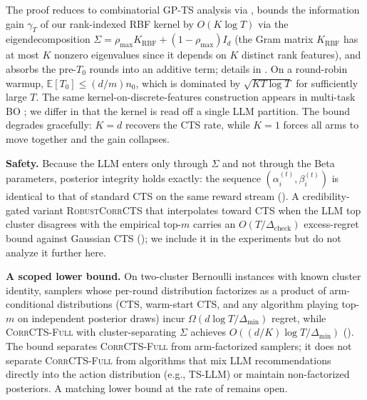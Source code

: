 \documentclass{article}
\theoremstyle{plain}
\theoremstyle{definition}
\theoremstyle{remark}
\newcommand{\E}{\mathbb{E}}
\newcommand{\gap}{\Delta_{\min}}
\newcommand{\CorrFull}{\textsc{CorrCTS-Full}}
\newcommand{\RobustCorr}{\textsc{RobustCorrCTS}}
\begin{document}
The proof reduces to combinatorial GP-TS analysis \citep{sandberg2025bayesian} via , bounds the information gain $\gamma_T$ of our rank-indexed RBF kernel by $O(K \log T)$ via the eigendecomposition $\Sigma = \rho_{\max} K_{\mathrm{RBF}} + (1 - \rho_{\max}) I_d$ (the Gram matrix $K_{\mathrm{RBF}}$ has at most $K$ nonzero eigenvalues since it depends on $K$ distinct rank features), and absorbs the pre-$T_0$ rounds into an additive term; details in .
On a round-robin warmup, $\E[T_0] \leq (d/m) n_0$, which is dominated by $\sqrt{KT\log T}$ for sufficiently large $T$.
The same kernel-on-discrete-features construction appears in multi-task BO \citep{swersky2013multitask}; we differ in that the kernel is read off a single LLM partition.
The bound degrades gracefully: $K = d$ recovers the CTS rate, while $K = 1$ forces all arms to move together and the gain collapses.

\textbf{Safety.}
Because the LLM enters only through $\Sigma$ and not through the Beta parameters, posterior integrity holds exactly: the sequence $(\alpha_i^{(t)}, \beta_i^{(t)})$ is identical to that of standard CTS on the same reward stream ().
A credibility-gated variant \RobustCorr{} that interpolates toward CTS when the LLM top cluster disagrees with the empirical top-$m$ carries an $O(T / \Delta_{\mathrm{check}})$ excess-regret bound against Gaussian CTS (); we include it in the experiments but do not analyze it further here.

\textbf{A scoped lower bound.}
On two-cluster Bernoulli instances with known cluster identity, samplers whose per-round distribution factorizes as a product of arm-conditional distributions (CTS, warm-start CTS, and any algorithm playing top-$m$ on independent posterior draws) incur $\Omega(d \log T / \gap)$ regret, while \CorrFull{} with cluster-separating $\Sigma$ achieves $O((d/K) \log T / \gap)$ ().
The bound separates \CorrFull{} from arm-factorized samplers; it does not separate \CorrFull{} from algorithms that mix LLM recommendations directly into the action distribution (e.g., TS-LLM) or maintain non-factorized posteriors. A matching lower bound at the rate of  remains open.
\end{document}
